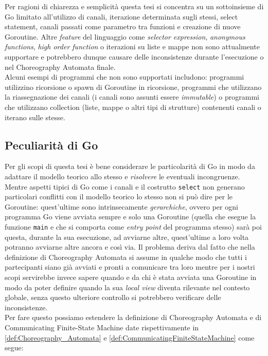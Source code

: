 Per ragioni di chiarezza e semplicità questa tesi si concentra su un sottoinsieme di Go limitato all'utilizzo di canali, iterazione determinata sugli stessi, select statement, canali passati come parametro tra funzioni e creazione di nuove Goroutine. Altre \emph{feature} del linguaggio come \emph{selector expression}, \emph{anonymous functions}, \emph{high order function} o iterazioni su liste e mappe non sono attualmente supportare e potrebbero dunque causare delle inconsistenze durante l'esecuzione o nel Choreography Automata finale. \\
Alcuni esempi di programmi che non sono supportati includono: programmi utilizzino ricorsione o spawn di Goroutine in ricorsione, programmi che utilizzano la riassegnazione dei canali (i canali sono assunti essere \emph{immutable}) o programmi che utilizzano collection (liste, mappe o altri tipi di strutture) contenenti canali o iterano sulle stesse. \\

\subsection{Peculiarità di Go}
Per gli scopi di questa tesi è bene considerare le particolarità di Go in modo da adattare il modello teorico allo stesso e \emph{risolvere} le eventuali incongruenze.\bigskip \\
Mentre aspetti tipici di Go come i canali e il costrutto \texttt{select} non generano particolari conflitti con il modello teorico lo stesso non si può dire per le Goroutine: quest'ultime sono intrinsecamente \emph{gerarchiche}, ovvero per ogni programma Go viene avviata sempre e solo una Goroutine (quella che esegue la funzione \texttt{main} e che si comporta come \emph{entry point} del programma stesso) sarà poi questa, durante la sua esecuzione, ad avviarne altre, quest'ultime a loro volta potranno avviarne altre ancora e così via.
Il problema deriva dal fatto che nella definizione di Choreography Automata si assume in qualche modo che tutti i partecipanti siano già avviati e pronti a comunicare tra loro mentre per i nostri scopi servirebbe invece sapere quando e da chi è stata avviata una Goroutine in modo da poter definire quando la sua \emph{local view} diventa rilevante nel contesto globale, senza questo ulteriore controllo si potrebbero verificare delle inconsistenze.\bigskip \\
Per fare questo possiamo estendere la definizione di Choreography Automata e di Communicating Finite-State Machine date rispettivamente in \ref{def:Choreography_Automata} e \ref{def:CommunicatingFiniteStateMachine} come segue:

